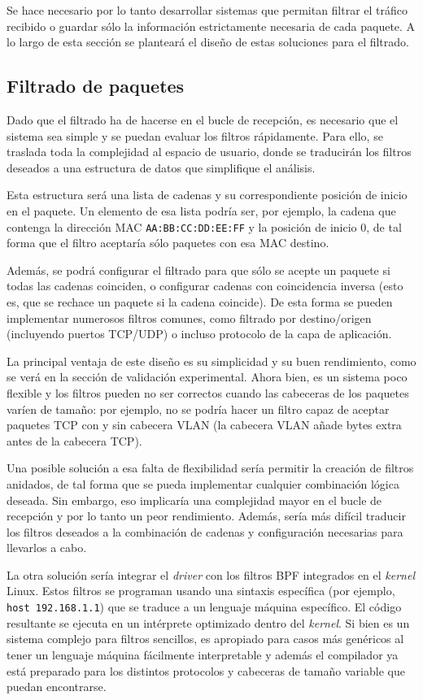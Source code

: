\documentclass[twoside, 12pt, draft]{epstfg}
\begin{document}
Se hace necesario por lo tanto desarrollar sistemas que permitan filtrar el tráfico recibido o guardar sólo la información estrictamente necesaria de cada paquete. A lo largo de esta sección se planteará el diseño de estas soluciones para el filtrado.

\subsection{Filtrado de paquetes}

Dado que el filtrado ha de hacerse en el bucle de recepción, es necesario que el sistema sea simple y se puedan evaluar los filtros rápidamente. Para ello, se traslada toda la complejidad al espacio de usuario, donde se traducirán los filtros deseados a una estructura de datos que simplifique el análisis.

Esta estructura será una lista de cadenas y su correspondiente posición de inicio en el paquete. Un elemento de esa lista podría ser, por ejemplo, la cadena que contenga la dirección MAC \texttt{AA:BB:CC:DD:EE:FF} y la posición de inicio 0, de tal forma que el filtro aceptaría sólo paquetes con esa MAC destino.

Además, se podrá configurar el filtrado para que sólo se acepte un paquete si todas las cadenas coinciden, o configurar cadenas con coincidencia inversa (esto es, que se rechace un paquete si la cadena coincide). De esta forma se pueden implementar numerosos filtros comunes, como filtrado por destino/origen (incluyendo puertos TCP/UDP) o incluso protocolo de la capa de aplicación.

La principal ventaja de este diseño es su simplicidad y su buen rendimiento, como se verá en la sección de validación experimental. Ahora bien, es un sistema poco flexible y los filtros pueden no ser correctos cuando las cabeceras de los paquetes varíen de tamaño: por ejemplo, no se podría hacer un filtro capaz de aceptar paquetes TCP con y sin cabecera VLAN (la cabecera VLAN añade bytes extra antes de la cabecera TCP).

Una posible solución a esa falta de flexibilidad sería permitir la creación de filtros anidados, de tal forma que se pueda implementar cualquier combinación lógica deseada. Sin embargo, eso implicaría una complejidad mayor en el bucle de recepción y por lo tanto un peor rendimiento. Además, sería más difícil traducir los filtros deseados a la combinación de cadenas y configuración necesarias para llevarlos a cabo.

La otra solución sería integrar el \textit{driver} con los filtros \gls{BPF} integrados en el \textit{kernel} Linux. Estos filtros se programan usando una sintaxis específica (por ejemplo, \texttt{host 192.168.1.1}) que se traduce a un lenguaje máquina específico. El código resultante se ejecuta en un intérprete optimizado dentro del \textit{kernel}. Si bien es un sistema complejo para filtros sencillos, es apropiado para casos más genéricos al tener un lenguaje máquina fácilmente interpretable y además el compilador ya está preparado para los distintos protocolos y cabeceras de tamaño variable que puedan encontrarse.
\end{document}
